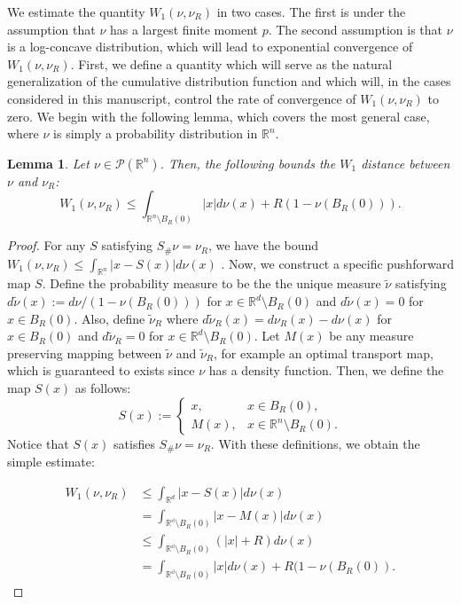 \documentclass{amsart}
\theoremstyle{lemma}
\newtheorem{lemma}[theorem]{Lemma}
\theoremstyle{remark}
\begin{document}
We estimate the quantity $W_{1}(\nu, \nu_{R})$ in two cases. The first is under the assumption that $\nu$ has a largest finite moment $p$. The second assumption is that $\nu$ is a log-concave distribution, which will lead to exponential convergence of $W_{1}(\nu, \nu_{R})$. First, we define a quantity which will serve as the natural generalization of the cumulative distribution function and which will, in the cases considered in this manuscript, control the rate of convergence of $W_{1}(\nu, \nu_R)$ to zero. We begin with the following lemma, which covers the most general case, where $\nu$ is simply a probability distribution in $\mathbb{R}^n$.
\begin{lemma}\label{lemma:firstbound}
Let $\nu \in \mathcal{P}(\mathbb{R}^n)$. Then, the following bounds the $W_1$ distance between $\nu$ and $\nu_R$:
\begin{equation}\label{eq:generalbound}
W_1(\nu, \nu_R) \leq \int_{\mathbb{R}^n \setminus B_{R}(0)} \vert x \vert d\nu(x) + R(1-\nu(B_{R}(0))).
\end{equation}
\end{lemma}
\begin{proof}
For any $S$ satisfying $S_{\#}\nu = \nu_R$, we have the bound $W_1(\nu, \nu_{R}) \leq \int_{\mathbb{R}^n} \vert x - S(x) \vert d\nu(x)$ . Now, we construct a specific pushforward map $S$. Define the probability measure to be the the unique measure $\tilde{\nu}$ satisfying $d\tilde{\nu}(x) := d\nu/(1-\nu(B_{R}(0)))$ for $x \in \mathbb{R}^d \setminus B_{R}(0)$ and $d \tilde{\nu}(x) = 0$ for $x \in B_{R}(0)$. Also, define $\tilde{\nu}_{R}$ where $d \tilde{\nu}_{R}(x) = d\nu_R(x) - d\nu(x)$ for $x \in B_{R}(0)$ and $d\tilde{\nu}_{R} = 0$ for $x \in \mathbb{R}^d \setminus B_{R}(0)$. Let $M(x)$ be any measure preserving mapping between $\tilde{\nu}$ and $\tilde{\nu}_{R}$, for example an optimal transport map, which is guaranteed to exists since $\nu$ has a density function. Then, we define the map $S(x)$ as follows:
\begin{equation}
S(x):= \begin{cases}
x, & x \in B_{R}(0), \\
M(x), & x \in \mathbb{R}^n \setminus B_{R}(0).
\end{cases}
\end{equation}
Notice that $S(x)$ satisfies $S_{\#}\nu = \nu_R$. With these definitions, we obtain the simple estimate:

\begin{align}
W_{1}(\nu, \nu_{R}) &\leq \int_{\mathbb{R}^d} \vert x-S(x) \vert d\nu(x) \\
&= \int_{\mathbb{R^d} \setminus B_{R}(0)} \vert x- M(x)\vert d\nu(x) \\
&\leq \int_{\mathbb{R^d} \setminus B_{R}(0)} (\left\vert x \right\vert+R)d\nu(x) \\
&= \int_{\mathbb{R^d} \setminus B_{R}(0)} \left\vert x \right\vert d\nu(x) + R(1-\nu(B_{R}(0)).
\end{align}
\end{proof}
\end{document}
